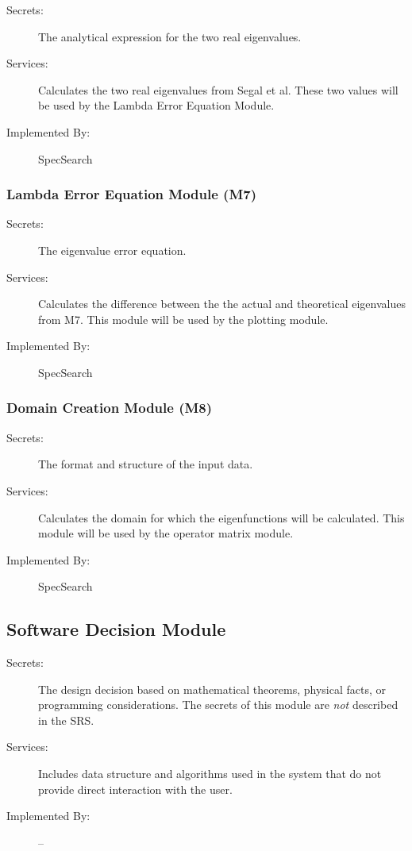 \documentclass[12pt, titlepage]{article}
\begin{document}
\begin{description}
	\item[Secrets:]The analytical expression for the two real eigenvalues. 
	\item[Services:]Calculates the two real eigenvalues from 
	Segal et al. These two values will be used by the Lambda Error Equation 
	Module. 
	\item[Implemented By:] SpecSearch
\end{description}

\subsubsection{Lambda Error Equation Module (M7)}

\begin{description}
	\item[Secrets:] The eigenvalue error equation.
	\item[Services:]Calculates the difference between the the actual and 
	theoretical eigenvalues from M7. This module will be used by the plotting 
	module. 
	\item[Implemented By:] SpecSearch
\end{description} 

\subsubsection{Domain Creation Module (M8)} 

\begin{description}
	\item[Secrets:] The format and structure of the input data.
	\item[Services:] Calculates the domain for which the eigenfunctions will be 
	calculated. This module will be used by the operator matrix module. 
	\item[Implemented By:] SpecSearch
\end{description}

\subsection{Software Decision Module}

\begin{description}
\item[Secrets:] The design decision based on mathematical theorems, physical
  facts, or programming considerations. The secrets of this module are
  \emph{not} described in the SRS.
\item[Services:] Includes data structure and algorithms used in the system that
  do not provide direct interaction with the user. 
\item[Implemented By:] --
\end{description}
\end{document}

